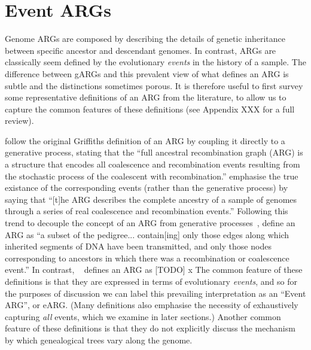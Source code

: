 \documentclass{article}
\begin{document}
\section*{Event ARGs}\label{eARG}
Genome ARGs are composed by
describing the details of genetic inheritance
between specific ancestor and descendant genomes.
In contrast, ARGs are classically seem defined
by the evolutionary \emph{events} in the history of a sample.
The difference between gARGs and this prevalent view of
what defines an ARG is subtle and the distinctions sometimes porous.
It is therefore useful to first survey some representative
definitions of
an ARG from the literature, to allow us to capture the common features
of these definitions
(see Appendix XXX for a full review).

\citet{brandt2021evaluation} follow the original Griffiths definition of
an ARG by coupling it directly to a generative process, stating
that the ``full ancestral recombination graph (ARG) is a structure that encodes all
coalescence and recombination events resulting from the stochastic process of
the coalescent with recombination.''
\citet{shipilina2023origin} emphasise the true existance of the
corresponding events (rather than the generative process) by saying that
``[t]he ARG describes the complete
ancestry of a sample of genomes through a series of real coalescence and
recombination events.''
Following this trend to decouple the concept of an ARG from
generative processes~\citep{minichiello2006mapping},
\cite{mathieson2020ancestry}
define an ARG as ``a subset of the pedigree...
contain[ing] only those edges along which inherited segments of DNA have been
transmitted, and only those nodes corresponding to ancestors in which there was
a recombination or coalescence event.''
In contrast, ~\citet{gusfield2014recombinatorics} defines an ARG as [TODO]
x
The common feature of these definitions is that they are expressed
in terms of evolutionary \emph{events}, and so for the purposes of
discussion we can label
this prevailing interpretation as an ``Event ARG'', or eARG.
(Many definitions also emphasise
the necessity of exhaustively capturing \emph{all} events, which we
examine in later sections.)
Another common feature of these definitions is that they do not explicitly
discuss the mechanism by which genealogical trees vary along the genome.
\end{document}
